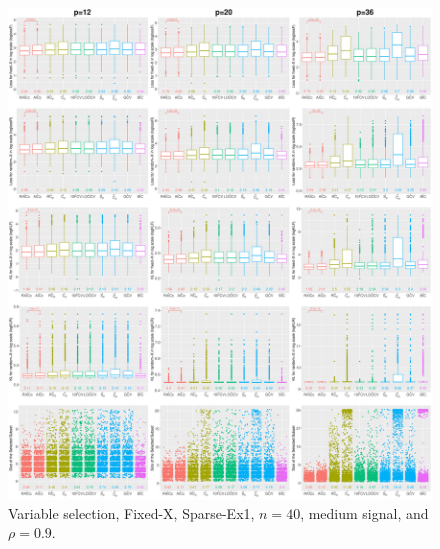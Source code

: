 \begin{figure}[!ht]
\centering
\includegraphics[width=\textwidth]{figures/supplement/fixedx/subset_selection/Sparse-Ex1_n40_msnr_rho09.eps}
\caption{Variable selection, Fixed-X, Sparse-Ex1, $n=40$, medium signal, and $\rho=0.9$.}
\end{figure}
\clearpage
